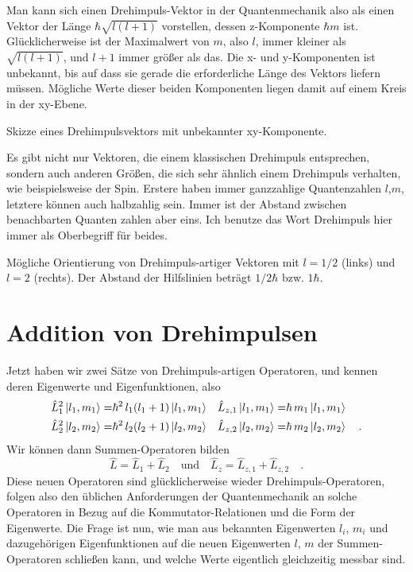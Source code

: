 Man kann sich einen Drehimpuls-Vektor in der Quantenmechanik also als einen Vektor der Länge $\hbar \sqrt{l (l+1)}$ vorstellen, dessen z-Komponente $\hbar m$ ist. Glücklicherweise ist der Maximalwert von $m$, also $l$, immer kleiner als $\sqrt{l (l+1)}$, und $l+1$ immer größer als das.
Die x- und y-Komponenten ist unbekannt, bis auf dass sie gerade die erforderliche Länge des Vektors liefern müssen. Mögliche Werte dieser beiden Komponenten liegen damit auf einem Kreis in der xy-Ebene.

\begin{marginfigure}
\caption{Skizze eines Drehimpulsvektors mit unbekannter xy-Komponente.}
\end{marginfigure}

Es gibt nicht nur Vektoren, die einem klassischen Drehimpuls entsprechen, sondern auch anderen Größen, die sich sehr ähnlich einem Drehimpuls verhalten, wie beispielsweise der Spin. Erstere haben immer ganzzahlige Quantenzahlen $l$,$m$, letztere können auch halbzahlig sein. Immer ist der Abstand zwischen benachbarten Quanten zahlen aber eins. Ich benutze das Wort Drehimpuls hier immer als Oberbegriff für beides.

\begin{marginfigure}

\caption{Mögliche Orientierung von  Drehimpuls-artiger Vektoren mit $l=1/2$ (links) und $l=2$ (rechts). Der Abstand der Hilfslinien beträgt $1/2 \hbar$ bzw. $1\hbar$.}
\end{marginfigure}

\section*{Addition von Drehimpulsen}


Jetzt haben wir zwei Sätze von Drehimpuls-artigen Operatoren, und kennen deren Eigenwerte und Eigenfunktionen, also
\begin{align}
	\hat{L}^2_1 \ket{l_1, m_1}  = & \hbar^2 \, l_1 (l_1 +1 ) \ket{l_1, m_1} &
	\hat{L}_{z,1} \ket{l_1, m_1} = & \hbar \, m_1 \ket{l_1, m_1} \\
		\hat{L}^2_2 \ket{l_2, m_2}  = & \hbar^2 \, l_2 (l_2 +1 ) \ket{l_2, m_2} &
	\hat{L}_{z,2} \ket{l_2, m_2} = & \hbar \, m_2 \ket{l_2, m_2}   \quad .
\end{align}
Wir können dann Summen-Operatoren bilden
\begin{equation}
\hat{L} = \hat{L}_1 + \hat{L}_2 \quad \text{und} \quad\hat{L}_{z} = \hat{L}_{z,1} + \hat{L}_{z,2}  \quad .
\end{equation}
Diese neuen Operatoren sind glücklicherweise wieder Drehimpuls-Operatoren, folgen also den üblichen Anforderungen der Quantenmechanik an solche Operatoren in Bezug auf die Kommutator-Relationen und die Form der Eigenwerte. Die Frage ist nun, wie man aus bekannten Eigenwerten $l_i$, $m_i$ und dazugehörigen Eigenfunktionen auf die neuen Eigenwerten $l$, $m$ der Summen-Operatoren schließen kann, und welche Werte eigentlich gleichzeitig messbar sind.

